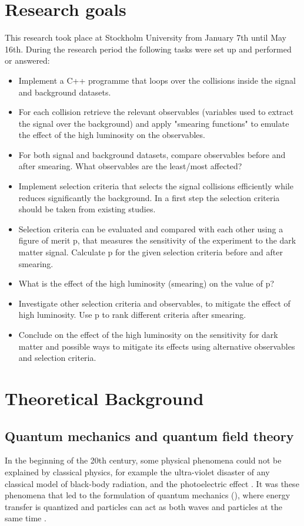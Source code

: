 \section{Research goals}\label{sec:goals}
This research took place at Stockholm University from January 7th until May 16th.
During the research period the following tasks were set up and performed or answered:
\begin{itemize}
\item Implement a C++ programme that loops over the collisions inside the signal and background datasets.	
\item For each collision retrieve the relevant observables (variables used to	 extract the signal over the background) and apply "smearing functions" to emulate the effect of the high luminosity on the observables. 	
\item For both signal and background datasets, compare observables before and after smearing. What observables are the least/most affected?	
\item Implement selection criteria that selects the signal collisions efficiently while reduces significantly the background. In a first step the selection criteria should be taken from existing studies.
\item Selection criteria can be evaluated and compared with each other using a figure of merit p, that measures the sensitivity of the experiment to the	 dark matter signal. Calculate p for the given selection criteria before and after smearing.
\item What is the effect of the high luminosity (smearing) on the value of p?
\item Investigate other selection criteria and observables, to mitigate the effect of high luminosity. Use p to rank different criteria after smearing.
\item Conclude on the effect of the high luminosity on the sensitivity for dark matter and possible ways to mitigate its effects using alternative observables and selection criteria. 
\end{itemize}
\newpage
\section{Theoretical Background}\label{sec:tb}
\subsection{Quantum mechanics and quantum field theory}\label{sec:tb:subsec:qm}
In the beginning of the 20th century, some physical phenomena could not be explained by classical physics, for example the ultra-violet disaster of any classical model of black-body radiation, and the photoelectric effect \citep{Bransden:2000}.
It was these phenomena that led to the formulation of quantum mechanics (\abbrQM), where energy transfer is quantized and particles can act as both waves and particles at the same time \citep{Hallsjo:2013}.

